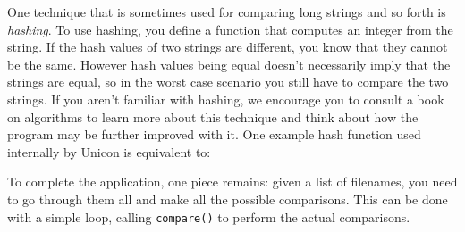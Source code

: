 
One technique that is sometimes used for comparing long strings and so
forth is \textit{hashing}. To use hashing, you define a
function that computes an integer from the string. If the hash values
of two strings are different, you know that they cannot be the same.
However hash values being equal doesn't necessarily
imply that the strings are equal, so in the worst case scenario you
still have to compare the two strings. If you aren't
familiar with hashing, we encourage you to consult a book on algorithms
to learn more about this technique and think about how the program may
be further improved with it. One example hash function used internally
by Unicon is equivalent to:


To complete the application, one piece remains: given a list of
filenames, you need to go through them all and make all the possible
comparisons. This can be done with a simple loop, calling
\texttt{compare()} to perform the actual comparisons. 


